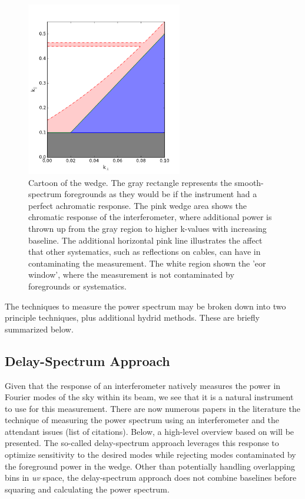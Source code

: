 \documentclass{article}
\begin{document}
\begin{figure}[t]
\includegraphics[height=3in]{plots/wedge.png}
\caption{Cartoon of the wedge.  The gray rectangle represents the smooth-spectrum foregrounds as they would be if the instrument had a perfect achromatic response.  The pink wedge area shows the chromatic response of the interferometer, where additional power is thrown up from the gray region to higher k-values with increasing baseline.  The additional horizontal pink line illustrates the affect that other systematics, such as reflections on cables, can have in contaminating the measurement.  The white region shown the 'eor window', where the measurement is not contaminated by foregrounds or systematics.
\label{fig:wedge}}
\end{figure}

The techniques to measure the power spectrum may be broken down into two principle techniques, plus additional hydrid methods.  These are briefly summarized below.

\subsection{Delay-Spectrum Approach}
\label{sec:delayapproach}
Given that the response of an interferometer natively measures the power in Fourier modes of the sky within its beam, we see that it is a natural instrument to use for this measurement.  There are now numerous papers in the literature the technique of measuring the power spectrum using an interferometer and the attendant issues (list of citations).  Below, a high-level overview based on  \cite{2012ApJ...756..165P} will be presented. The so-called delay-spectrum approach leverages this response to optimize sensitivity to the desired modes while rejecting modes contaminated by the foreground power in the wedge.  Other than potentially handling overlapping bins in {\em uv} space, the delay-spectrum approach does not combine baselines before squaring and calculating the power spectrum.
\end{document}

